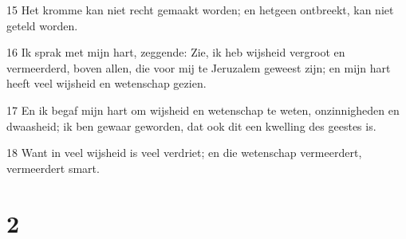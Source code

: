 \par 15 Het kromme kan niet recht gemaakt worden; en hetgeen ontbreekt, kan niet geteld worden.
\par 16 Ik sprak met mijn hart, zeggende: Zie, ik heb wijsheid vergroot en vermeerderd, boven allen, die voor mij te Jeruzalem geweest zijn; en mijn hart heeft veel wijsheid en wetenschap gezien.
\par 17 En ik begaf mijn hart om wijsheid en wetenschap te weten, onzinnigheden en dwaasheid; ik ben gewaar geworden, dat ook dit een kwelling des geestes is.
\par 18 Want in veel wijsheid is veel verdriet; en die wetenschap vermeerdert, vermeerdert smart.

\chapter{2}

